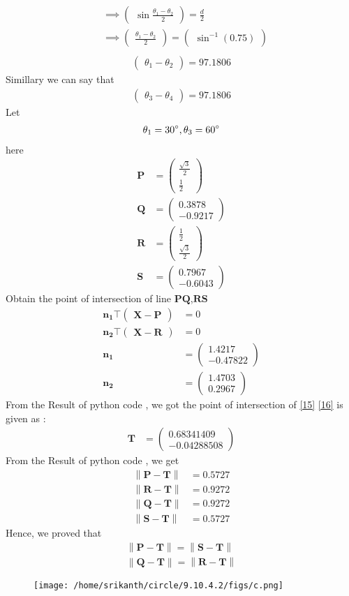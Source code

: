 \documentclass[12pt]{article}
\providecommand{\norm}[1]{\left\lVert#1\right\rVert}
\newcommand{\myvec}[1]{\ensuremath{\begin{pmatrix}#1\end{pmatrix}}}
\let\vec\mathbf
\begin{document}
\begin{enumerate}
\begin{align*}
	&\implies\myvec{\sin\frac{\theta_1-\theta_2}{2}}=\frac{d}{2}\\
&\implies\myvec{\frac{\theta_1-\theta_2}{2}}=\myvec{\sin^{-1}(0.75)}\\
	\end{align*}
\begin{align}
	\myvec{\theta_1-\theta_2}=97.1806 
	\end{align}
Simillary we can say that
\begin{align}
	\myvec{\theta_3-\theta_4}=97.1806   		       
\end{align}	
Let
\begin{align}
\theta_1=30\degree,\theta_3=60\degree
\end{align}
here
\begin{align}
\vec{P}&=\myvec{\frac{\sqrt{3}}{2}\\[2pt]\frac{1}{2}}\\
\vec{Q}&=\myvec{0.3878\\-0.9217}\\
\vec{R}&=\myvec{\frac{1}{2}\\[2pt]\frac{\sqrt{3}}{2}}\\
\vec{S}&=\myvec{0.7967\\-0.6043}
\end{align}
Obtain the point of intersection of line $\vec{PQ}$,$\vec{RS}$
\begin{align}
\vec{n_1\top\myvec{\vec{X}-\vec{P}}}&=0\label{15}\\
\vec{n_2\top\myvec{\vec{X}-\vec{R}}}&=0\label{16}\\
\vec{n_1}&=\myvec{1.4217\\-0.47822}\\
\vec{n_2}&=\myvec{1.4703\\0.2967}
\end{align}
From the Result of python code , we got the point of intersection of \eqref{15} \eqref{16}  is given as :
\begin{align}
\vec{T}&=\myvec{0.68341409\\-0.04288508}
\end{align}
From the Result of python code , we get
\begin{align}
\norm{\vec{P}-\vec{T}}&=0.5727\\
\norm{\vec{R}-\vec{T}}&=0.9272\\
\norm{\vec{Q}-\vec{T}}&=0.9272\\
\norm{\vec{S}-\vec{T}}&=0.5727
\end{align}
Hence, we proved that
\begin{align}
\norm{\vec{P}-\vec{T}}=\norm{\vec{S}-\vec{T}}\\
\norm{\vec{Q}-\vec{T}}=\norm{\vec{R}-\vec{T}}
\end{align} 
\begin{figure}[!h]
	\begin{center} 
	  \texttt{[image: /home/srikanth/circle/9.10.4.2/figs/c.png]}
	\end{center}
\caption{}
\label{fig:Fig1}
\end{figure}
\end{enumerate}
\end{document}
